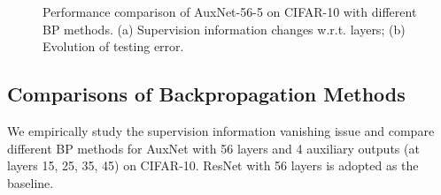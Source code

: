 \documentclass[10pt,onecolumn,letterpaper]{article}
\def\mF{{\mathcal F}}
\def\bmW{\mbox{\boldmath${\mathcal W}$}}
\def\bx{{\bf x}}
\def\SexyName{AuxNet\xspace}
\begin{document}




\begin{figure}[t]
\centering



\caption{Performance comparison of \SexyName-56-5 on CIFAR-10 with different BP methods. (a) Supervision information changes w.r.t. layers; (b) Evolution of testing error.}\label{fig:grad}
\vspace{-0.8em}
\end{figure}


\subsection{Comparisons of Backpropagation Methods }\label{sec:bpcomparision}
We empirically study the supervision information vanishing issue and compare different BP methods for \SexyName with 56 layers and 4 auxiliary outputs (at layers 15, 25, 35, 45) on CIFAR-10. ResNet with 56 layers is adopted as the baseline.
\end{document}
